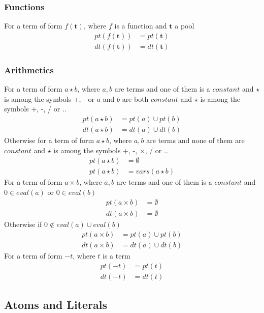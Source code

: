 \documentclass{article}
\newcommand{\pool}[1]{\boldsymbol{#1}}
\begin{document}
	\subsubsection{Functions}
	For a term of form $f(\pool{t})$, where $f$ is a function and $\pool{t}$ a pool
	\begin{align*}
		pt(f(\pool{t})) &= pt(\pool{t}) \\
		dt(f(\pool{t})) &= dt(\pool{t})
	\end{align*}
	\subsubsection{Arithmetics}
	For a term of form $a \star b$, where $a,b$ are terms and one of them is a $\mathit{constant}$ and $\star$ is among the symbols +, - or $a$ and $b$ are both $\mathit{constant}$ and $\star$ is among the symbols +, -, / or ..
	\begin{align*}
		pt(a \star b) &= pt(a) \cup pt(b) \\
		dt(a \star b) &= dt(a) \cup dt(b)
	\end{align*}
	Otherwise for a term of form $a \star b$, where $a,b$ are terms and none of them are $\mathit{constant}$ and $\star$ is among the symbols +, -, $\times$, / or ..
	\begin{align*}
		pt(a \star b) &= \emptyset \\
		pt(a \star b) &= vars(a \star b)
	\end{align*}
	For a term of form $a \times b$, where $a,b$ are terms and one of them is a $\mathit{constant}$ and $0 \in \mathit{eval}(a)$ or $0 \in \mathit{eval}(b)$
	\begin{align*}
		pt(a \times b) &= \emptyset \\
		dt(a \times b) &= \emptyset
	\end{align*}
	Otherwise if $0 \notin eval(a) \cup eval(b)$
	\begin{align*}
		pt(a \times b) &= pt(a) \cup pt(b) \\
		dt(a \times b) &= dt(a) \cup dt(b)
	\end{align*}
	For a term of form $-t$, where $t$ is a term
	\begin{align*}
		pt(-t) &= pt(t) \\
		dt(-t) &= dt(t)
	\end{align*}

	\subsection{Atoms and Literals}
\end{document}
